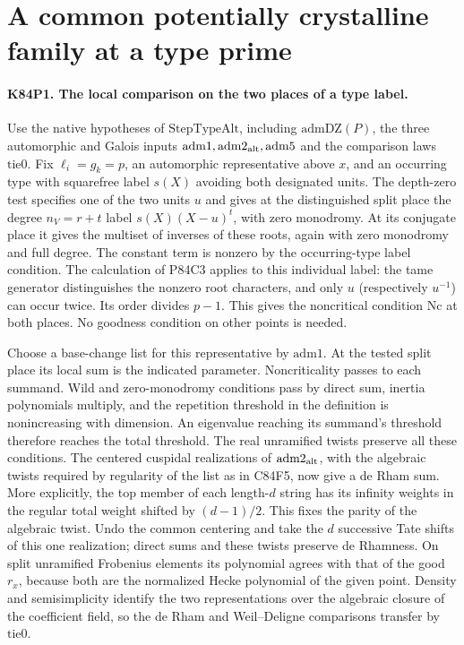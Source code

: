 \section{A common potentially crystalline family at a type prime}

\paragraph{K84P1. The local comparison on the two places of a type label.}
Use the native hypotheses of $\mathrm{StepTypeAlt}$, including
$\mathrm{admDZ}(P)$, the three automorphic and Galois inputs
$\mathrm{adm1},\mathrm{adm2}_{\rm alt},\mathrm{adm5}$ and the
comparison laws $\mathrm{tie0}$. Fix $\ell_i=g_k=p$, an automorphic
representative above $x$, and an occurring type with squarefree label
$s(X)$ avoiding both designated units. The depth-zero test specifies
one of the two units $u$ and gives at the distinguished split place
the degree $n_V=r+t$ label $s(X)(X-u)^t$, with zero monodromy.
At its conjugate place it gives the multiset of inverses of these
roots, again with zero monodromy and full degree. The constant term
is nonzero by the occurring-type label condition. The calculation of
P84C3 applies to this individual label: the tame generator
distinguishes the nonzero root characters, and only $u$ (respectively
$u^{-1}$) can occur twice. Its order divides $p-1$. This gives the
noncritical condition $\mathrm{Nc}$ at both places. No goodness
condition on other points is needed.

Choose a base-change list for this representative by $\mathrm{adm1}$.
At the tested split place its local sum is the indicated parameter.
Noncriticality passes to each summand. Wild and zero-monodromy
conditions pass by direct sum, inertia polynomials multiply, and
the repetition threshold in the definition is nonincreasing with
dimension. An eigenvalue reaching its summand's threshold therefore
reaches the total threshold. The real unramified twists preserve
all these conditions. The centered cuspidal realizations of
$\mathrm{adm2}_{\rm alt}$, with the algebraic twists required
by regularity of the list as in C84F5, now give a de Rham sum. More explicitly, the top
member of each length-$d$ string has its infinity weights in the
regular total weight shifted by $(d-1)/2$. This fixes the parity
of the algebraic twist. Undo the common centering and take the
$d$ successive Tate shifts of this one realization; direct sums
and these twists preserve de Rhamness.
On split unramified Frobenius elements its polynomial agrees with
that of the good $r_x$, because both are the normalized Hecke
polynomial of the given point. Density and semisimplicity identify
the two representations over the algebraic closure of the
coefficient field, so the de Rham and Weil--Deligne comparisons
transfer by $\mathrm{tie0}$.

